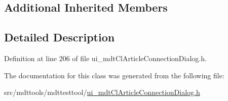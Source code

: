 \subsection*{Additional Inherited Members}


\subsection{Detailed Description}


Definition at line 206 of file ui\-\_\-mdt\-Cl\-Article\-Connection\-Dialog.\-h.



The documentation for this class was generated from the following file\-:\begin{DoxyCompactItemize}
\item 
src/mdttools/mdttesttool/\hyperlink{ui__mdt_cl_article_connection_dialog_8h}{ui\-\_\-mdt\-Cl\-Article\-Connection\-Dialog.\-h}\end{DoxyCompactItemize}
